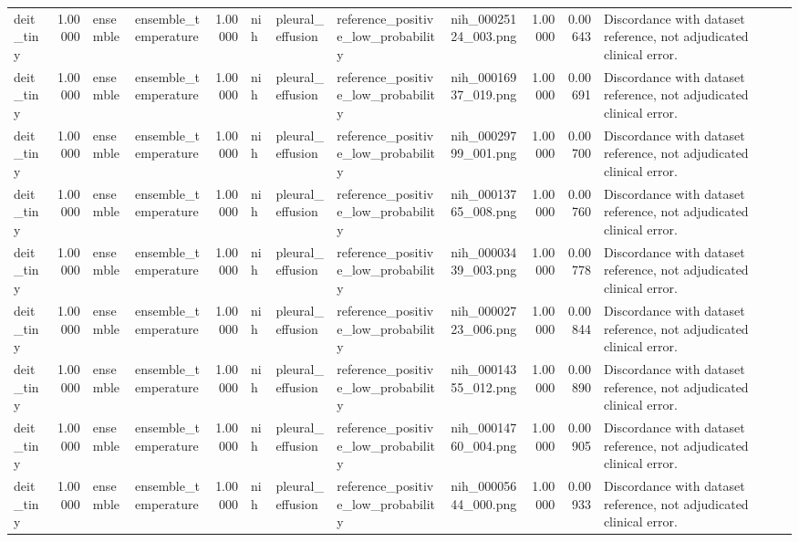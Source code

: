 \begin{tabular}{lrllrllllrrl}
deit\_tiny & 1.00000 & ensemble & ensemble\_temperature & 1.00000 & nih & pleural\_effusion & reference\_positive\_low\_probability & nih\_00025124\_003.png & 1.00000 & 0.00643 & Discordance with dataset reference, not adjudicated clinical error. \\
deit\_tiny & 1.00000 & ensemble & ensemble\_temperature & 1.00000 & nih & pleural\_effusion & reference\_positive\_low\_probability & nih\_00016937\_019.png & 1.00000 & 0.00691 & Discordance with dataset reference, not adjudicated clinical error. \\
deit\_tiny & 1.00000 & ensemble & ensemble\_temperature & 1.00000 & nih & pleural\_effusion & reference\_positive\_low\_probability & nih\_00029799\_001.png & 1.00000 & 0.00700 & Discordance with dataset reference, not adjudicated clinical error. \\
deit\_tiny & 1.00000 & ensemble & ensemble\_temperature & 1.00000 & nih & pleural\_effusion & reference\_positive\_low\_probability & nih\_00013765\_008.png & 1.00000 & 0.00760 & Discordance with dataset reference, not adjudicated clinical error. \\
deit\_tiny & 1.00000 & ensemble & ensemble\_temperature & 1.00000 & nih & pleural\_effusion & reference\_positive\_low\_probability & nih\_00003439\_003.png & 1.00000 & 0.00778 & Discordance with dataset reference, not adjudicated clinical error. \\
deit\_tiny & 1.00000 & ensemble & ensemble\_temperature & 1.00000 & nih & pleural\_effusion & reference\_positive\_low\_probability & nih\_00002723\_006.png & 1.00000 & 0.00844 & Discordance with dataset reference, not adjudicated clinical error. \\
deit\_tiny & 1.00000 & ensemble & ensemble\_temperature & 1.00000 & nih & pleural\_effusion & reference\_positive\_low\_probability & nih\_00014355\_012.png & 1.00000 & 0.00890 & Discordance with dataset reference, not adjudicated clinical error. \\
deit\_tiny & 1.00000 & ensemble & ensemble\_temperature & 1.00000 & nih & pleural\_effusion & reference\_positive\_low\_probability & nih\_00014760\_004.png & 1.00000 & 0.00905 & Discordance with dataset reference, not adjudicated clinical error. \\
deit\_tiny & 1.00000 & ensemble & ensemble\_temperature & 1.00000 & nih & pleural\_effusion & reference\_positive\_low\_probability & nih\_00005644\_000.png & 1.00000 & 0.00933 & Discordance with dataset reference, not adjudicated clinical error. \\

\end{tabular}
